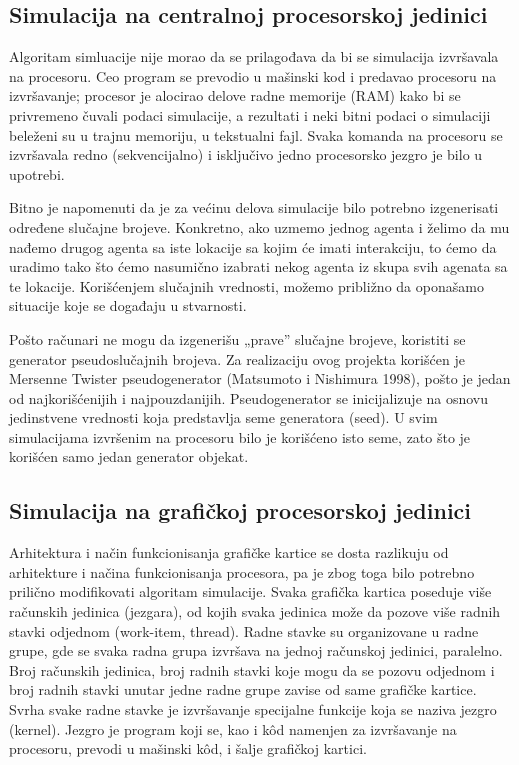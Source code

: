 \subsection{Simulacija na centralnoj procesorskoj jedinici}

Algoritam simluacije nije morao da se prilagođava da bi se simulacija izvršavala na procesoru. Ceo program se prevodio u mašinski kod i predavao procesoru na izvršavanje; procesor je alocirao delove radne memorije (RAM) kako bi se privremeno čuvali podaci simulacije, a rezultati i neki bitni podaci o simulaciji beleženi su u trajnu memoriju, u tekstualni fajl. Svaka komanda na procesoru se izvršavala redno (sekvencijalno) i isključivo jedno procesorsko jezgro je bilo u upotrebi. 

Bitno je napomenuti da je za većinu delova simulacije bilo potrebno izgenerisati određene slučajne brojeve. Konkretno, ako uzmemo jednog agenta i želimo da mu nađemo drugog agenta sa iste lokacije sa kojim će imati interakciju, to ćemo da uradimo tako što ćemo nasumično izabrati nekog agenta iz skupa svih agenata sa te lokacije. Korišćenjem slučajnih vrednosti, možemo približno da oponašamo situacije koje se događaju u stvarnosti. 

Pošto računari ne mogu da izgenerišu „prave” slučajne brojeve, koristiti se generator pseudoslučajnih brojeva. Za realizaciju ovog projekta korišćen je Mersenne Twister pseudogenerator (Matsumoto i Nishimura 1998), pošto je jedan od najkorišćenijih i najpouzdanijih. Pseudogenerator se inicijalizuje na osnovu jedinstvene vrednosti koja predstavlja seme generatora (seed). U svim simulacijama izvršenim na procesoru bilo je korišćeno isto seme, zato što je korišćen samo jedan generator objekat.

\subsection{Simulacija na grafičkoj procesorskoj jedinici}

Arhitektura i način funkcionisanja grafičke kartice se dosta razlikuju od arhitekture i načina funkcionisanja procesora, pa je zbog toga bilo potrebno prilično modifikovati algoritam simulacije. Svaka grafička kartica poseduje više računskih jedinica (jezgara), od kojih svaka jedinica može da pozove više radnih stavki odjednom (work-item, thread). Radne stavke su organizovane u radne grupe, gde se svaka radna grupa izvršava na jednoj računskoj jedinici, paralelno. Broj računskih jedinica, broj radnih stavki koje mogu da se pozovu odjednom i broj radnih stavki unutar jedne radne grupe zavise od same grafičke kartice. Svrha svake radne stavke je izvršavanje specijalne funkcije koja se naziva jezgro (kernel). Jezgro je program koji se, kao i kôd namenjen za izvršavanje na procesoru, prevodi u mašinski kôd, i šalje grafičkoj kartici.

